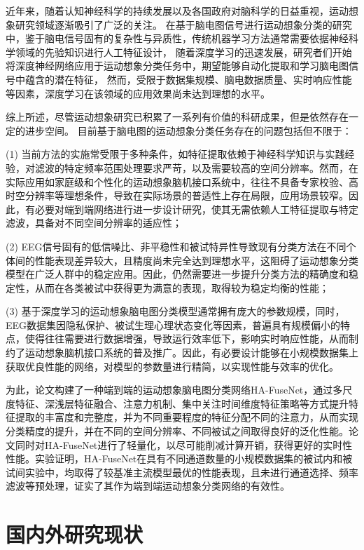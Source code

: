 近年来，随着认知神经科学的持续发展以及各国政府对脑科学的日益重视，运动想象研究领域逐渐吸引了广泛的关注。
在基于脑电图信号进行运动想象分类的研究中，鉴于脑电信号固有的复杂性与异质性，传统机器学习方法通常需要依据神经科学领域的先验知识进行人工特征设计，
随着深度学习的迅速发展，研究者们开始将深度神经网络应用于运动想象分类任务中，期望能够自动化提取和学习脑电图信号中蕴含的潜在特征，
然而，受限于数据集规模、脑电数据质量、实时响应性能等因素，深度学习在该领域的应用效果尚未达到理想的水平。

综上所述，尽管运动想象研究已积累了一系列有价值的科研成果，但是依然存在一定的进步空间。
目前基于脑电图的运动想象分类任务存在的问题包括但不限于：

(1) 当前方法的实施常受限于多种条件，如特征提取依赖于神经科学知识与实践经验，对滤波的特定频率范围处理要求严苛，以及需要较高的空间分辨率。然而，在实际应用如家庭级和个性化的运动想象脑机接口系统中，往往不具备专家校验、高时空分辨率等理想条件，导致在实际场景的普适性上存在局限，应用场景较窄。因此，有必要对端到端网络进行进一步设计研究，使其无需依赖人工特征提取与特定滤波，具备对不同空间分辨率的适应性；

(2) EEG信号固有的低信噪比、非平稳性和被试特异性导致现有分类方法在不同个体间的性能表现差异较大，且精度尚未完全达到理想水平，这阻碍了运动想象分类模型在广泛人群中的稳定应用。因此，仍然需要进一步提升分类方法的精确度和稳定性，从而在各类被试中获得更为满意的表现，取得较为稳定均衡的性能；

(3) 基于深度学习的运动想象脑电图分类模型通常拥有庞大的参数规模，同时，EEG数据集因隐私保护、被试生理心理状态变化等因素，普遍具有规模偏小的特点，使得往往需要进行数据增强，导致运行效率低下，影响实时响应性能，从而制约了运动想象脑机接口系统的普及推广。因此，有必要设计能够在小规模数据集上获取优良性能的网络，对模型的参数量进行精简，以实现性能与效率的优化。

为此，论文构建了一种端到端的运动想象脑电图分类网络HA-FuseNet，通过多尺度特征、深浅层特征融合、注意力机制、集中关注时间维度特征策略等方式提升特征提取的丰富度和完整度，并为不同重要程度的特征分配不同的注意力，从而实现分类精度的提升，并在不同的空间分辨率、不同被试之间取得良好的泛化性能。论文同时对HA-FuseNet进行了轻量化，以尽可能削减计算开销，获得更好的实时性性能。实验证明，HA-FuseNet在具有不同通道数量的小规模数据集的被试内和被试间实验中，均取得了较基准主流模型最优的性能表现，且未进行通道选择、频率滤波等预处理，证实了其作为端到端运动想象分类网络的有效性。

\section{国内外研究现状}

